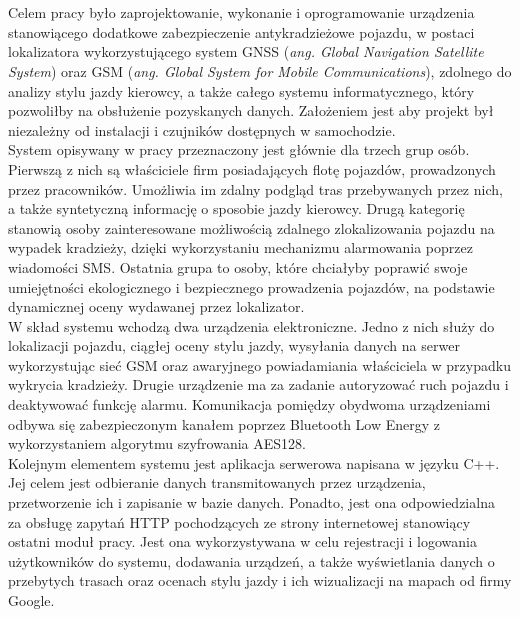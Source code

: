 \thispagestyle{empty}
\\

\\

\begin{singlespacing}

Celem pracy było zaprojektowanie, wykonanie i oprogramowanie urządzenia stanowiącego dodatkowe zabezpieczenie antykradzieżowe pojazdu, w postaci lokalizatora wykorzystującego system GNSS (\textit{ang. Global Navigation Satellite System}) oraz GSM (\textit{ang. Global System for Mobile Communications}), zdolnego do analizy stylu jazdy kierowcy, a także całego systemu informatycznego, który pozwoliłby na obsłużenie pozyskanych danych. Założeniem jest aby projekt był niezależny od instalacji i czujników dostępnych w samochodzie.\\

System opisywany w pracy przeznaczony jest głównie dla trzech grup osób. Pierwszą z nich są właściciele firm posiadających flotę pojazdów, prowadzonych przez pracowników. Umożliwia im zdalny podgląd tras przebywanych przez nich, a także syntetyczną informację o sposobie jazdy kierowcy. Drugą kategorię stanowią osoby zainteresowane możliwością zdalnego zlokalizowania pojazdu na wypadek kradzieży, dzięki wykorzystaniu mechanizmu alarmowania poprzez wiadomości SMS. Ostatnia grupa to osoby, które chciałyby poprawić swoje umiejętności ekologicznego i bezpiecznego prowadzenia pojazdów, na podstawie dynamicznej oceny wydawanej przez lokalizator. \\

W skład systemu wchodzą dwa urządzenia elektroniczne. Jedno z nich służy do lokalizacji pojazdu, ciągłej oceny stylu jazdy, wysyłania danych na serwer wykorzystując sieć GSM oraz awaryjnego powiadamiania właściciela w przypadku wykrycia kradzieży. Drugie urządzenie ma za zadanie autoryzować ruch pojazdu i deaktywować funkcję alarmu. Komunikacja pomiędzy obydwoma urządzeniami odbywa się zabezpieczonym kanałem poprzez Bluetooth Low Energy z wykorzystaniem algorytmu szyfrowania AES128. \\

Kolejnym elementem systemu jest aplikacja serwerowa napisana w języku C++. Jej celem jest odbieranie danych transmitowanych przez urządzenia, przetworzenie ich i zapisanie w bazie danych. Ponadto, jest ona odpowiedzialna za obsługę zapytań HTTP pochodzących ze strony internetowej stanowiący ostatni moduł pracy. Jest ona wykorzystywana w celu rejestracji i logowania użytkowników do systemu, dodawania urządzeń, a także wyświetlania danych o przebytych trasach oraz ocenach stylu jazdy i ich wizualizacji na mapach od firmy Google. \\


\end{singlespacing}
